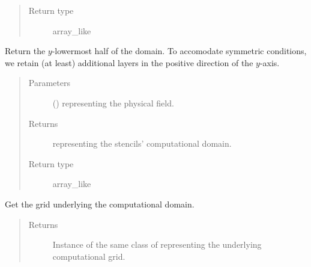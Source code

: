 \documentclass[letterpaper,10pt,english]{sphinxmanual}
\begin{document}
\begin{fulllineitems}
\begin{fulllineitems}
\begin{quote}
\begin{description}
\item[{Return type}] \leavevmode
array\_like

\end{description}\end{quote}

\end{fulllineitems}


\begin{fulllineitems}
\label{\detokenize{api:tasmania.dycore.horizontal_boundary_relaxed.RelaxedSymmetricXZ.from_physical_to_computational_domain}}
Return the \(y\)-lowermost half of the domain. To accomodate symmetric conditions,
we retain (at least)  additional layers in the positive direction of the \(y\)-axis.
\begin{quote}\begin{description}
\item[{Parameters}] \leavevmode
{} () \textendash{}  representing the physical field.

\item[{Returns}] \leavevmode
{} representing the stencils’ computational domain.

\item[{Return type}] \leavevmode
array\_like

\end{description}\end{quote}

\end{fulllineitems}


\begin{fulllineitems}
\label{\detokenize{api:tasmania.dycore.horizontal_boundary_relaxed.RelaxedSymmetricXZ.get_computational_grid}}
Get the  grid underlying the computational domain.
\begin{quote}\begin{description}
\item[{Returns}] \leavevmode
Instance of the same class of 
representing the underlying computational grid.


\end{description}
\end{quote}
\end{fulllineitems}
\end{fulllineitems}
\end{document}
